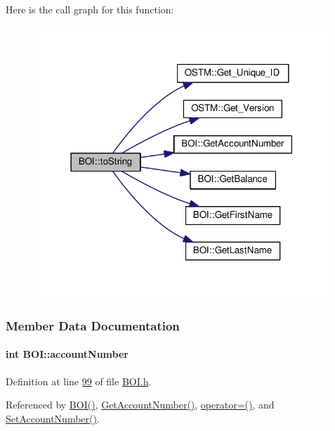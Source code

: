 Here is the call graph for this function\+:\nopagebreak
\begin{figure}[H]
\begin{center}
\leavevmode
\includegraphics[width=316pt]{class_b_o_i_ab02a4dd4ebcc5b2abfaca19f2dff2006_ab02a4dd4ebcc5b2abfaca19f2dff2006_cgraph}
\end{center}
\end{figure}




\subsubsection{Member Data Documentation}
\paragraph[{\texorpdfstring{account\+Number}{accountNumber}}]{\setlength{\rightskip}{0pt plus 5cm}int B\+O\+I\+::account\+Number\hspace{0.3cm}{\ttfamily [private]}}\hypertarget{class_b_o_i_a35c9fd6e938eb44ad4e076bc6a736851_a35c9fd6e938eb44ad4e076bc6a736851}{}\label{class_b_o_i_a35c9fd6e938eb44ad4e076bc6a736851_a35c9fd6e938eb44ad4e076bc6a736851}


Definition at line \hyperlink{_b_o_i_8h_source_l00099}{99} of file \hyperlink{_b_o_i_8h_source}{B\+O\+I.\+h}.



Referenced by \hyperlink{_b_o_i_8h_source_l00024}{B\+O\+I()}, \hyperlink{_b_o_i_8cpp_source_l00078}{Get\+Account\+Number()}, \hyperlink{_b_o_i_8h_source_l00065}{operator=()}, and \hyperlink{_b_o_i_8cpp_source_l00074}{Set\+Account\+Number()}.


